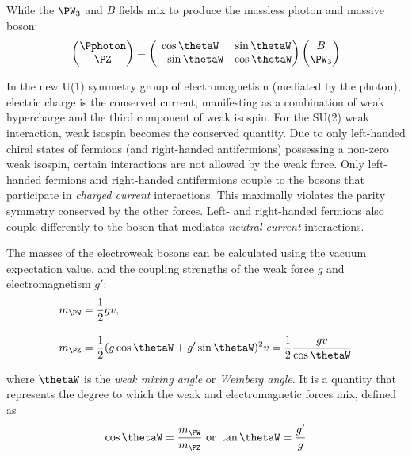 While the $\PW_3$ and $B$ fields mix to produce the massless photon and massive \PZ boson:
\begin{equation}
    \begin{pmatrix} \Pphoton \\ \PZ \end{pmatrix} = \begin{pmatrix} \cos\thetaW & \sin\thetaW \\ -\sin\thetaW & \cos\thetaW \end{pmatrix} \begin{pmatrix} B \\ \PW_3 \end{pmatrix}
    \label{eq:EWSB_photon_Z}
\end{equation}

In the new U(1) symmetry group of electromagnetism (mediated by the photon), electric charge is the conserved current, manifesting as a combination of weak hypercharge and the third component of weak isospin. For the SU(2) weak interaction, weak isospin becomes the conserved quantity. Due to only left-handed chiral states of fermions (and right-handed antifermions) possessing a non-zero weak isospin, certain interactions are not allowed by the weak force. Only left-handed fermions and right-handed antifermions couple to the \PW bosons that participate in \emph{charged current} interactions. This maximally violates the parity symmetry conserved by the other forces. Left- and right-handed fermions also couple differently to the \PZ boson that mediates \emph{neutral current} interactions.

The masses of the electroweak bosons can be calculated using the vacuum expectation value, and the coupling strengths of the weak force $g$ and electromagnetism $g'$:
\begin{equation}
    \begin{aligned}
m_{\PW} &= \frac{1}{2} gv, \\[1em]
m_{\PZ} &= \frac{1}{2} (g\cos\thetaW + g'\sin\thetaW)^2 v = \frac{1}{2}\frac{gv}{\cos\thetaW}
    \end{aligned}
    \label{eq:w_z_masses}
\end{equation}

where $\thetaW$ is the \emph{weak mixing angle} or \emph{Weinberg angle}. It is a quantity that represents the degree to which the weak and electromagnetic forces mix, defined as
\begin{equation}
    \cos\thetaW = \frac{m_{\PW}}{m_{\PZ}} \ \text{or} \ \tan\thetaW = \frac{g'}{g}
    \label{eq:weak_mixing_angle}
\end{equation}

